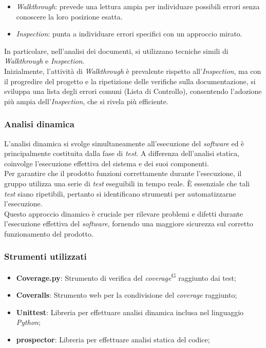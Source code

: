 \documentclass[5pt]{article}
\begin{document}
    \begin{itemize}
    \item \textit{Walkthrough}: prevede una lettura ampia per individuare possibili errori senza conoscere la loro posizione esatta.
    \item \textit{Inspection}: punta a individuare errori specifici con un approccio mirato.
    \end{itemize}
    In particolare, nell'analisi dei documenti, si utilizzano tecniche simili di \textit{Walkthrough} e \textit{Inspection}.\\
    Inizialmente, l'attività di \textit{Walkthrough} è prevalente rispetto all'\textit{Inspection}, ma con il progredire del progetto e la ripetizione delle verifiche sulla documentazione, si sviluppa una lista degli errori comuni (Lista di Controllo), consentendo l'adozione più ampia dell'\textit{Inspection}, che si rivela più efficiente.
    \subsubsection{Analisi dinamica}
    L'analisi dinamica si svolge simultaneamente all'esecuzione del \textit{software} ed è principalmente costituita dalla fase di \textit{test}. A differenza dell'analisi statica, coinvolge l'esecuzione effettiva del sistema e dei suoi componenti.\\
    Per garantire che il prodotto funzioni correttamente durante l'esecuzione, il gruppo utilizza una serie di \textit{test} eseguibili in tempo reale. È essenziale che tali \textit{test} siano ripetibili, pertanto si identificano strumenti per automatizzarne l'esecuzione.\\
    Questo approccio dinamico è cruciale per rilevare problemi e difetti durante l'esecuzione effettiva del \textit{software}, fornendo una maggiore sicurezza sul corretto funzionamento del prodotto.
    
   \subsubsection{Strumenti utilizzati}
   \begin{itemize}
   	\item \textbf{Coverage.py}: Strumento di verifica del \textit{coverage}\textsuperscript{G} raggiunto dai test;
   	\item \textbf{Coveralls}: Strumento web per la condivisione del \textit{coverage} raggiunto;
   	\item \textbf{Unittest}: Libreria per effettuare analisi dinamica inclusa nel linguaggio \textit{Python};
   	\item \textbf{prospector}: Libreria per effettuare analisi statica del codice;
   	
    \end{itemize}
	
\end{document}
